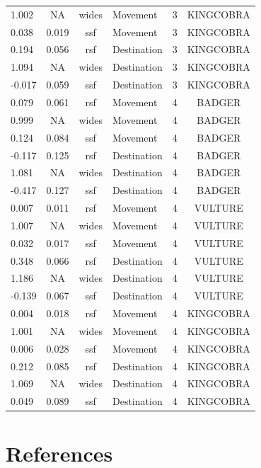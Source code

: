 \documentclass[10pt,a4paper]{article}
\begin{document}
\begin{table}
{\begin{tabular}[t]{lcclcc}
1.002 & NA & wides & Movement & 3 & KINGCOBRA\\
0.038 & 0.019 & ssf & Movement & 3 & KINGCOBRA\\
0.194 & 0.056 & rsf & Destination & 3 & KINGCOBRA\\
1.094 & NA & wides & Destination & 3 & KINGCOBRA\\
-0.017 & 0.059 & ssf & Destination & 3 & KINGCOBRA\\
0.079 & 0.061 & rsf & Movement & 4 & BADGER\\
0.999 & NA & wides & Movement & 4 & BADGER\\
0.124 & 0.084 & ssf & Movement & 4 & BADGER\\
-0.117 & 0.125 & rsf & Destination & 4 & BADGER\\
1.081 & NA & wides & Destination & 4 & BADGER\\
-0.417 & 0.127 & ssf & Destination & 4 & BADGER\\
0.007 & 0.011 & rsf & Movement & 4 & VULTURE\\
1.007 & NA & wides & Movement & 4 & VULTURE\\
0.032 & 0.017 & ssf & Movement & 4 & VULTURE\\
0.348 & 0.066 & rsf & Destination & 4 & VULTURE\\
1.186 & NA & wides & Destination & 4 & VULTURE\\
-0.139 & 0.067 & ssf & Destination & 4 & VULTURE\\
0.004 & 0.018 & rsf & Movement & 4 & KINGCOBRA\\
1.001 & NA & wides & Movement & 4 & KINGCOBRA\\
0.006 & 0.028 & ssf & Movement & 4 & KINGCOBRA\\
0.212 & 0.085 & rsf & Destination & 4 & KINGCOBRA\\
1.069 & NA & wides & Destination & 4 & KINGCOBRA\\
0.049 & 0.089 & ssf & Destination & 4 & KINGCOBRA\\

\end{tabular}}
\end{table}

\clearpage

\section*{References}\label{references}
\end{document}
